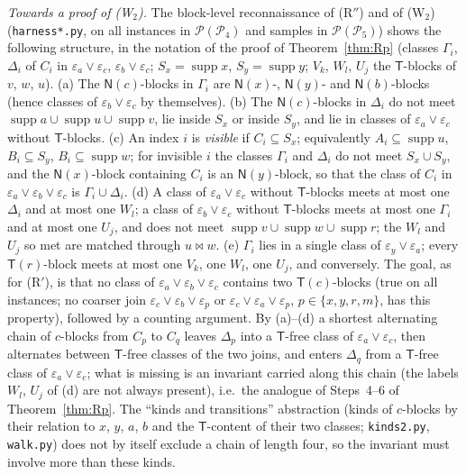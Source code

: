 \documentclass[11pt]{amsart}
\theoremstyle{definition}
\renewcommand{\P}{\mathcal{P}}
\newcommand{\supp}{\operatorname{supp}}
\newcommand{\T}{\mathsf{T}}
\newcommand{\N}{\mathsf{N}}
\newcommand{\mt}{\bowtie}   %
\begin{document}
\smallskip
\emph{Towards a proof of (W$_2$).} The block-level reconnaissance of (R$''$) and of (W$_2$) (\texttt{harness*.py}, on all instances in $\P(\P_4)$ and samples in $\P(\P_5)$) shows the following structure, in the notation of the proof of Theorem~\ref{thm:Rp} (classes $\Gamma_i$, $\Delta_i$ of $C_i$ in $\varepsilon_a\vee\varepsilon_c$, $\varepsilon_b\vee\varepsilon_c$; $S_x=\supp x$, $S_y=\supp y$; $V_k$, $W_l$, $U_j$ the $\T$-blocks of $v$, $w$, $u$). (a) The $\N(c)$-blocks in $\Gamma_i$ are $\N(x)$-, $\N(y)$- and $\N(b)$-blocks (hence classes of $\varepsilon_b\vee\varepsilon_c$ by themselves). (b) The $\N(c)$-blocks in $\Delta_i$ do not meet $\supp a\cup\supp u\cup\supp v$, lie inside $S_x$ or inside $S_y$, and lie in classes of $\varepsilon_a\vee\varepsilon_c$ without $\T$-blocks. (c) An index $i$ is \emph{visible} if $C_i\subseteq S_x$; equivalently $A_i\subseteq\supp u$, $B_i\subseteq S_y$, $B_i\subseteq\supp w$; for invisible $i$ the classes $\Gamma_i$ and $\Delta_i$ do not meet $S_x\cup S_y$, and the $\N(x)$-block containing $C_i$ is an $\N(y)$-block, so that the class of $C_i$ in $\varepsilon_a\vee\varepsilon_b\vee\varepsilon_c$ is $\Gamma_i\cup\Delta_i$. (d) A class of $\varepsilon_a\vee\varepsilon_c$ without $\T$-blocks meets at most one $\Delta_i$ and at most one $W_l$; a class of $\varepsilon_b\vee\varepsilon_c$ without $\T$-blocks meets at most one $\Gamma_i$ and at most one $U_j$, and does not meet $\supp v\cup\supp w\cup\supp r$; the $W_l$ and $U_j$ so met are matched through $u\mt w$. (e) $\Gamma_i$ lies in a single class of $\varepsilon_y\vee\varepsilon_a$; every $\T(r)$-block meets at most one $V_k$, one $W_l$, one $U_j$, and conversely. The goal, as for (R$'$), is that no class of $\varepsilon_a\vee\varepsilon_b\vee\varepsilon_c$ contains two $\T(c)$-blocks (true on all instances; no coarser join $\varepsilon_c\vee\varepsilon_b\vee\varepsilon_p$ or $\varepsilon_c\vee\varepsilon_a\vee\varepsilon_p$, $p\in\{x,y,r,m\}$, has this property), followed by a counting argument. By (a)--(d) a shortest alternating chain of $c$-blocks from $C_p$ to $C_q$ leaves $\Delta_p$ into a $\T$-free class of $\varepsilon_a\vee\varepsilon_c$, then alternates between $\T$-free classes of the two joins, and enters $\Delta_q$ from a $\T$-free class of $\varepsilon_a\vee\varepsilon_c$; what is missing is an invariant carried along this chain (the labels $W_l$, $U_j$ of (d) are not always present), i.e.\ the analogue of Steps~4--6 of Theorem~\ref{thm:Rp}. The ``kinds and transitions'' abstraction (kinds of $c$-blocks by their relation to $x$, $y$, $a$, $b$ and the $\T$-content of their two classes; \texttt{kinds2.py}, \texttt{walk.py}) does not by itself exclude a chain of length four, so the invariant must involve more than these kinds.
\end{document}
